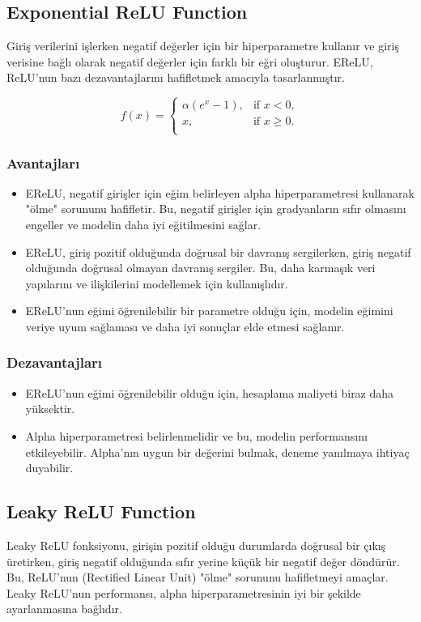 \subsection{Exponential ReLU Function}
Giriş verilerini işlerken negatif değerler için bir hiperparametre kullanır ve giriş verisine bağlı olarak negatif değerler için farklı bir eğri oluşturur. EReLU, ReLU'nun bazı dezavantajlarını hafifletmek amacıyla tasarlanmıştır.

\[f(x) = \begin{cases} 
\alpha(e^x - 1), & \text{if } x < 0, \\
x, & \text{if } x \geq 0. \\
\end{cases}\]

\subsubsection{Avantajları}
\begin{itemize}
    \item EReLU, negatif girişler için eğim belirleyen alpha hiperparametresi kullanarak "ölme" sorununu hafifletir. Bu, negatif girişler için gradyanların sıfır olmasını engeller ve modelin daha iyi eğitilmesini sağlar.
    \item EReLU, giriş pozitif olduğunda doğrusal bir davranış sergilerken, giriş negatif olduğunda doğrusal olmayan davranış sergiler. Bu, daha karmaşık veri yapılarını ve ilişkilerini modellemek için kullanışlıdır.
    \item EReLU'nun eğimi öğrenilebilir bir parametre olduğu için, modelin eğimini veriye uyum sağlaması ve daha iyi sonuçlar elde etmesi sağlanır.
\end{itemize}

\subsubsection{Dezavantajları}
\begin{itemize}
    \item EReLU'nun eğimi öğrenilebilir olduğu için, hesaplama maliyeti biraz daha yüksektir.
    \item Alpha hiperparametresi belirlenmelidir ve bu, modelin performansını etkileyebilir. Alpha'nın uygun bir değerini bulmak, deneme yanılmaya ihtiyaç duyabilir.
\end{itemize}

\newpage

\subsection{Leaky ReLU Function}
Leaky ReLU fonksiyonu, girişin pozitif olduğu durumlarda doğrusal bir çıkış üretirken, giriş negatif olduğunda sıfır yerine küçük bir negatif değer döndürür. Bu, ReLU'nun (Rectified Linear Unit) "ölme" sorununu hafifletmeyi amaçlar. Leaky ReLU'nun performansı, alpha hiperparametresinin iyi bir şekilde ayarlanmasına bağlıdır.

